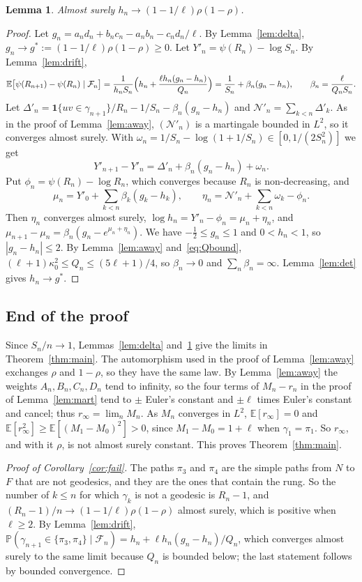 \documentclass[11pt]{amsart}
\newtheorem{lemma}[theorem]{Lemma}
\theoremstyle{remark}
\newcommand{\PP}{\mathbb{P}}
\newcommand{\EE}{\mathbb{E}}
\newcommand{\cF}{\mathcal{F}}
\newcommand{\one}{\mathbf{1}}
\begin{document}
\begin{lemma}\label{lem:rung}
Almost surely $h_n\to(1-1/\ell)\rho(1-\rho)$.
\end{lemma}
\begin{proof}
Let $g_n=a_nd_n+b_nc_n-a_nb_n-c_nd_n/\ell$. By Lemma~\ref{lem:delta}, $g_n\to g^*:=(1-1/\ell)\rho(1-\rho)\ge0$.
Let $Y'_n=\psi(R_n)-\log S_n$. By Lemma~\ref{lem:drift},
\[
\EE\bigl[\psi(R_{n+1})-\psi(R_n)\mid\cF_n\bigr]=\frac{1}{h_nS_n}\Bigl(h_n+\frac{\ell h_n(g_n-h_n)}{Q_n}\Bigr)
=\frac1{S_n}+\beta_n(g_n-h_n),\qquad\beta_n=\frac{\ell}{Q_nS_n} .
\]
Let $\Delta'_n=\one\{uv\in\gamma_{n+1}\}/R_n-1/S_n-\beta_n(g_n-h_n)$ and $\mathcal N'_n=\sum_{k<n}\Delta'_k$. As in
the proof of Lemma~\ref{lem:away}, $(\mathcal N'_n)$ is a martingale bounded in $L^2$, so it converges almost surely.
With $\omega_n=1/S_n-\log(1+1/S_n)\in[0,1/(2S_n^2)]$ we get
\[
Y'_{n+1}-Y'_n=\Delta'_n+\beta_n(g_n-h_n)+\omega_n .
\]
Put $\phi_n=\psi(R_n)-\log R_n$, which converges because $R_n$ is non-decreasing, and
\[
\mu_n=Y'_0+\sum_{k<n}\beta_k(g_k-h_k),\qquad\eta_n=\mathcal N'_n+\sum_{k<n}\omega_k-\phi_n .
\]
Then $\eta_n$ converges almost surely, $\log h_n=Y'_n-\phi_n=\mu_n+\eta_n$, and
$\mu_{n+1}-\mu_n=\beta_n(g_n-e^{\mu_n+\eta_n})$. We have $-\frac12\le g_n\le1$ and $0<h_n<1$, so $|g_n-h_n|\le2$. By
Lemma~\ref{lem:away} and~\eqref{eq:Qbound}, $(\ell+1)\kappa_0^2\le Q_n\le(5\ell+1)/4$, so $\beta_n\to0$ and
$\sum_n\beta_n=\infty$. Lemma~\ref{lem:det} gives $h_n\to g^*$.
\end{proof}

\subsection{End of the proof}
Since $S_n/n\to1$, Lemmas~\ref{lem:delta} and~\ref{lem:rung} give the limits in Theorem~\ref{thm:main}. The
automorphism used in the proof of Lemma~\ref{lem:away} exchanges $\rho$ and $1-\rho$, so they have the same law. By
Lemma~\ref{lem:away} the weights $A_n,B_n,C_n,D_n$ tend to infinity, so the four terms of $M_n-r_n$ in the proof of
Lemma~\ref{lem:mart} tend to $\pm$ Euler's constant and $\pm\ell$ times Euler's constant and cancel; thus
$r_\infty=\lim_nM_n$. As $M_n$ converges in $L^2$, $\EE[r_\infty]=0$ and
$\EE[r_\infty^2]\ge\EE[(M_1-M_0)^2]>0$, since $M_1-M_0=1+\ell$ when $\gamma_1=\pi_1$. So $r_\infty$, and with it
$\rho$, is not almost surely constant. This proves Theorem~\ref{thm:main}.

\begin{proof}[Proof of Corollary~\ref{cor:fail}]
The paths $\pi_3$ and $\pi_4$ are the simple paths from $N$ to $F$ that are not geodesics, and they are the ones that
contain the rung. So the number of $k\le n$ for which $\gamma_k$ is not a geodesic is $R_n-1$, and
$(R_n-1)/n\to(1-1/\ell)\rho(1-\rho)$ almost surely, which is positive when $\ell\ge2$. By Lemma~\ref{lem:drift},
$\PP(\gamma_{n+1}\in\{\pi_3,\pi_4\}\mid\cF_n)=h_n+\ell h_n(g_n-h_n)/Q_n$, which converges almost surely to the same
limit because $Q_n$ is bounded below; the last statement follows by bounded convergence.
\end{proof}
\end{document}
